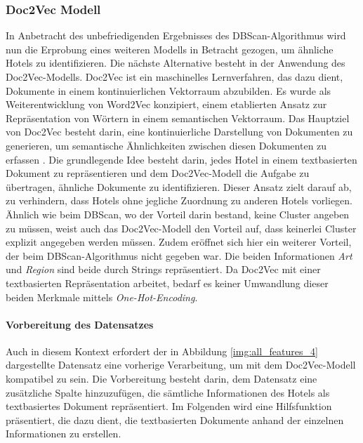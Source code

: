 \subsubsection{Doc2Vec Modell}
\label{subsubsec:doc2vec}
In Anbetracht des unbefriedigenden Ergebnisses des DBScan-Algorithmus wird nun die Erprobung eines weiteren Modells in Betracht gezogen, um ähnliche Hotels zu identifizieren. Die nächste Alternative besteht in der Anwendung des Doc2Vec-Modells.
\newline
\newline
Doc2Vec ist ein maschinelles Lernverfahren, das dazu dient, Dokumente in einem kontinuierlichen Vektorraum abzubilden. Es wurde als Weiterentwicklung von Word2Vec konzipiert, einem etablierten Ansatz zur Repräsentation von Wörtern in einem semantischen Vektorraum. Das Hauptziel von Doc2Vec besteht darin, eine kontinuierliche Darstellung von Dokumenten zu generieren, um semantische Ähnlichkeiten zwischen diesen Dokumenten zu erfassen \cite{LeV.16.05.2014}.
\newline
\newline
Die grundlegende Idee besteht darin, jedes Hotel in einem textbasierten Dokument zu repräsentieren und dem Doc2Vec-Modell die Aufgabe zu übertragen, ähnliche Dokumente zu identifizieren. Dieser Ansatz zielt darauf ab, zu verhindern, dass Hotels ohne jegliche Zuordnung zu anderen Hotels vorliegen.
\newline
\newline
Ähnlich wie beim DBScan, wo der Vorteil darin bestand, keine Cluster angeben zu müssen, weist auch das Doc2Vec-Modell den Vorteil auf, dass keinerlei Cluster explizit angegeben werden müssen. Zudem eröffnet sich hier ein weiterer Vorteil, der beim DBScan-Algorithmus nicht gegeben war. Die beiden Informationen \emph{Art} und \emph{Region} sind beide durch Strings repräsentiert. Da Doc2Vec mit einer textbasierten Repräsentation arbeitet, bedarf es keiner Umwandlung dieser beiden Merkmale mittels \emph{One-Hot-Encoding}.

\paragraph{Vorbereitung des Datensatzes} 
Auch in diesem Kontext erfordert der in Abbildung \ref{img:all_features_4} dargestellte Datensatz eine vorherige Verarbeitung, um mit dem Doc2Vec-Modell kompatibel zu sein. Die Vorbereitung besteht darin, dem Datensatz eine zusätzliche Spalte hinzuzufügen, die sämtliche Informationen des Hotels als textbasiertes Dokument repräsentiert. 
\newline
\newline
Im Folgenden wird eine Hilfsfunktion präsentiert, die dazu dient, die textbasierten Dokumente anhand der einzelnen Informationen zu erstellen.

